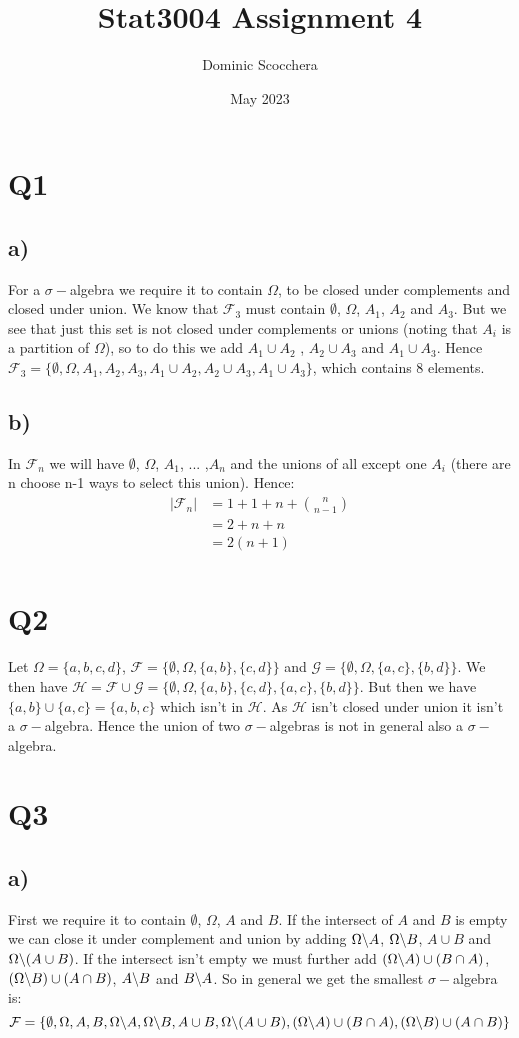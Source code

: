 \documentclass{article}
\title{Stat3004 Assignment 4}
\author{Dominic Scocchera}
\date{May 2023}
\begin{document}
\maketitle
\section*{Q1}
\subsection*{a)}
For a $\sigma-$algebra we require it to contain $\Omega$, to be closed under complements and closed under union. We know that $\mathcal{F}_3$ must contain $\emptyset$, $\Omega$, $A_1$, $A_2$ and $A_3$. But we see that just this set is not closed under complements or unions (noting that $A_i$ is a partition of $\Omega$), so to do this we add $A_1\cup A_2$ , $A_2\cup A_3$ and $A_1\cup A_3$. Hence $\mathcal{F}_3=\{\emptyset,\Omega,A_1,A_2,A_3,A_1\cup A_2,A_2\cup A_3,A_1\cup A_3\}$, which contains 8 elements.  
\subsection*{b)}
In $\mathcal{F}_n$ we will have $\emptyset$, $\Omega$, $A_1$, ... ,$A_n$ and the unions of all except one $A_i$ (there are n choose n-1 ways to select this union). Hence:
\begin{align*}
|\mathcal{F}_n|&=1+1+n+{n\choose n-1}\\
&=2+n+n\\
&=2(n+1)\\
\end{align*} 
\section*{Q2}
Let $\Omega=\{a,b,c,d\}$, $\mathcal{F}=\{\emptyset,\Omega,\{a,b\},\{c,d\}\}$ and $\mathcal{G}=\{\emptyset,\Omega,\{a,c\},\{b,d\}\}$. We then have $\mathcal{H}=\mathcal{F}\cup\mathcal{G}=\{\emptyset,\Omega,\{a,b\},\{c,d\},\{a,c\},\{b,d\}\}$. But then we have $\{a,b\}\cup\{a,c\}=\{a,b,c\}$ which isn't in $\mathcal{H}$. As $\mathcal{H}$ isn't closed under union it isn't a $\sigma-$algebra. Hence the union of two $\sigma-$algebras is not in general also a $\sigma-$algebra.
\section*{Q3}
\subsection*{a)}
First we require it to contain $\emptyset$, $\Omega$, $A$ and $B$. If the intersect of $A$ and $B$ is empty we can close it under complement and union by adding $\Omega\symbol{92}A$, $\Omega\symbol{92}B$, $A\cup B$ and $\Omega\symbol{92}(A\cup B)$. If the intersect isn't empty we must further add $(\Omega\symbol{92}A)\cup(B\cap A)$, $(\Omega\symbol{92}B)\cup(A\cap B)$, $A\symbol{92}B$ and $B\symbol{92}A$. So in general we get the smallest $\sigma-$algebra is:
$$\mathcal{F}=\{\emptyset,\Omega,A,B,\Omega\symbol{92}A,\Omega\symbol{92}B,A\cup B,\Omega\symbol{92}(A\cup B),(\Omega\symbol{92}A)\cup(B\cap A),(\Omega\symbol{92}B)\cup(A\cap B)\}$$
\end{document}
